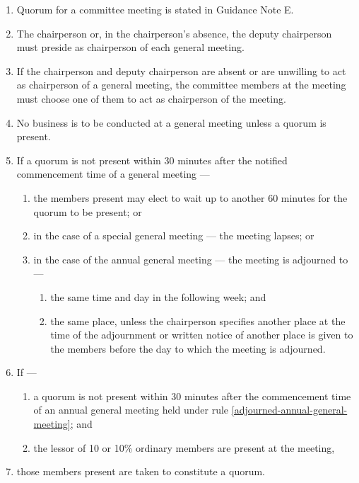 \documentclass[../constitution.tex]{subfiles}
\begin{document}
\begin{enumerate}

\item Quorum for a committee meeting is stated in Guidance Note E.
\item The chairperson or, in the chairperson's absence, the deputy chairperson must preside as chairperson of each general meeting.
\item If the chairperson and deputy chairperson are absent or are unwilling to act as chairperson of a general meeting, the committee members at the meeting must choose one of them to act as chairperson of the meeting.
\item No business is to be conducted at a general meeting unless a quorum is present.
\item If a quorum is not present within 30 minutes after the notified commencement time of a general meeting ---

  \begin{enumerate}
  
  \item the members present may elect to wait up to another 60 minutes for the quorum to be present; or
  \item in the case of a special general meeting --- the meeting lapses; or
  \item in the case of the annual general meeting --- the meeting is adjourned to --- \label{adjourned-annual-general-meeting}

    \begin{enumerate}
    
    \item the same time and day in the following week; and
    \item the same place, unless the chairperson specifies another place at the time of the adjournment or written notice of another place is given to the members before the day to which the meeting is adjourned.
    \end{enumerate}
  \end{enumerate}
\item If ---

  \begin{enumerate}
  
  \item a quorum is not present within 30 minutes after the commencement time of an annual general meeting held under rule \ref{adjourned-annual-general-meeting}; and
  \item the lessor of 10 or 10\% ordinary members are present at the meeting,
  \end{enumerate}
\item those members present are taken to constitute a quorum.
\end{enumerate}
\end{document}
